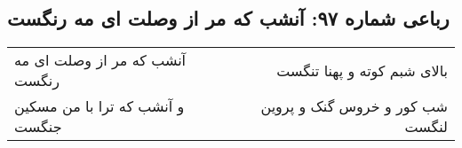 \begin{center}
\section*{رباعی شماره ۹۷: آنشب که مر از وصلت ای مه رنگست}
\label{sec:sh097}
\begin{longtable}{l p{0.5cm} r}
آنشب که مر از وصلت ای مه رنگست
&&
بالای شبم کوته و پهنا تنگست
\\
و آنشب که ترا با من مسکین جنگست
&&
شب کور و خروس گنک و پروین لنگست
\\
\end{longtable}
\end{center}
